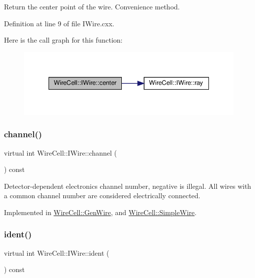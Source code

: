 Return the center point of the wire. Convenience method. 



Definition at line 9 of file I\+Wire.\+cxx.

Here is the call graph for this function\+:
\nopagebreak
\begin{figure}[H]
\begin{center}
\leavevmode
\includegraphics[width=335pt]{class_wire_cell_1_1_i_wire_aec6abd930c2209a7bd809b30a871d1b6_cgraph}
\end{center}
\end{figure}
\mbox{\label{class_wire_cell_1_1_i_wire_a24de34af80ad78b15137adb196ed1189}} 
\subsubsection{\texorpdfstring{channel()}{channel()}}
{\footnotesize\ttfamily virtual int Wire\+Cell\+::\+I\+Wire\+::channel (\begin{DoxyParamCaption}{ }\end{DoxyParamCaption}) const\hspace{0.3cm}{\ttfamily [pure virtual]}}

Detector-\/dependent electronics channel number, negative is illegal. All wires with a common channel number are considered electrically connected. 

Implemented in \hyperlink{class_wire_cell_1_1_gen_wire_a98e2ccfbe7f784cdcddbb49e8097be6f}{Wire\+Cell\+::\+Gen\+Wire}, and \hyperlink{class_wire_cell_1_1_simple_wire_afc85442561cf9421725bde79eb55b611}{Wire\+Cell\+::\+Simple\+Wire}.

\mbox{\label{class_wire_cell_1_1_i_wire_a0e188a183e202dfb6dce25f6b16fc390}} 
\subsubsection{\texorpdfstring{ident()}{ident()}}
{\footnotesize\ttfamily virtual int Wire\+Cell\+::\+I\+Wire\+::ident (\begin{DoxyParamCaption}{ }\end{DoxyParamCaption}) const\hspace{0.3cm}{\ttfamily [pure virtual]}}


